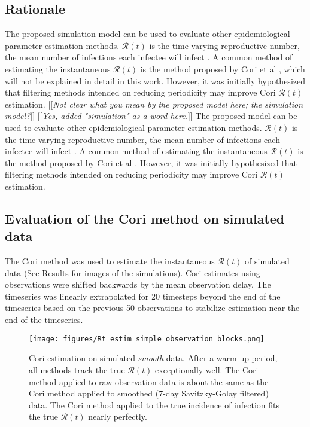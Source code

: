 \documentclass{article}
\newcommand{\nR}{\mathcal{R}}
\newcommand{\jd}[1]{[[\textsl{#1}]]} %
\newcommand{\msComment}[1]{[[\textsl{#1}]]}
\begin{document}
\subsection{Rationale}
The proposed simulation model can be used to evaluate other epidemiological parameter estimation methods. $\nR(t)$ is the time-varying reproductive number, the mean number of infections each infectee will infect \cite{Gostic}. A common method of estimating the instantaneous $\nR(t)$ is the method proposed by Cori et al \cite{Cori}, which will not be explained in detail in this work. However, it was initially hypothesized that filtering methods intended on reducing periodicity may improve Cori $\nR(t)$ estimation. 
\jd{Not clear what you mean by the proposed model here; the simulation model?} \msComment{Yes, added "simulation" as a word here.}
The proposed model can be used to evaluate other epidemiological parameter estimation methods. $\nR(t)$ is the time-varying reproductive number, the mean number of infections each infectee will infect \cite{Gostic}. A common method of estimating the instantaneous $\nR(t)$ is the method proposed by Cori et al \cite{Cori}. However, it was initially hypothesized that filtering methods intended on reducing periodicity may improve Cori $\nR(t)$ estimation. 


\subsection{Evaluation of the Cori method on simulated data}
The Cori method was used to estimate the instantaneous $\nR(t)$ of simulated data (See Results for images of the simulations). Cori estimates using observations were shifted backwards by the mean observation delay. The timeseries was linearly extrapolated for 20 timesteps beyond the end of the timeseries based on the previous 50 observations to stabilize estimation near the end of the timeseries.

\begin{figure}[h!]
\centering
\texttt{[image: figures/Rt\_estim\_simple\_observation\_blocks.png]}
\caption{Cori estimation on simulated \emph{smooth} data. After a warm-up period, all methods track the true $\nR(t)$ exceptionally well. The Cori method applied to raw observation data is about the same as the Cori method applied to smoothed (7-day Savitzky-Golay filtered) data. The Cori method applied to the true incidence of infection fits the true $\nR(t)$ nearly perfectly.}
\end{figure}
\end{document}
